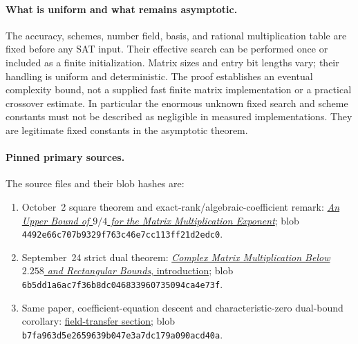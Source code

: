 \paragraph{What is uniform and what remains asymptotic.}
The accuracy, schemes, number field, basis, and rational multiplication
table are fixed before any SAT input. Their effective search can be
performed once or included as a finite initialization. Matrix sizes and
entry bit lengths vary; their handling is uniform and deterministic.
The proof establishes an eventual complexity bound, not a supplied fast
finite matrix implementation or a practical crossover estimate. In
particular the enormous unknown fixed search and scheme constants must
not be described as negligible in measured implementations. They are
legitimate fixed constants in the asymptotic theorem.

\paragraph{Pinned primary sources.}
The source files and their blob hashes are:
\begin{enumerate}
\item October~2 square theorem and exact-rank/algebraic-coefficient
remark: \href{https://github.com/openai/math/blob/7ef5c0cc5ca4b0e072b7a050fca09ab24bc6fa3a/preprints/Matrix-Multiplication-Nine-Fourths-October-2-2026/build/paper.tex}{\emph{An Upper Bound of $9/4$ for the Matrix Multiplication Exponent}};
blob \texttt{4492e66c707b9329f763c46e7cc113ff21d2edc0}.
\item September~24 strict dual theorem:
\href{https://github.com/openai/math/blob/7ef5c0cc5ca4b0e072b7a050fca09ab24bc6fa3a/preprints/Complex-Matrix-Multiplication-Below-2.258-and-Rectangular-Bounds-September-24-2026/build/introduction.tex}{\emph{Complex Matrix Multiplication Below $2.258$ and Rectangular Bounds}, introduction};
blob \texttt{6b5dd1a6ac7f36b8dc046833960735094ca4e73f}.
\item Same paper, coefficient-equation descent and characteristic-zero
dual-bound corollary:
\href{https://github.com/openai/math/blob/7ef5c0cc5ca4b0e072b7a050fca09ab24bc6fa3a/preprints/Complex-Matrix-Multiplication-Below-2.258-and-Rectangular-Bounds-September-24-2026/build/rectangular/08-comparison.tex}{field-transfer section};
blob \texttt{b7fa963d5e2659639b047e3a7dc179a090acd40a}.
\end{enumerate}

